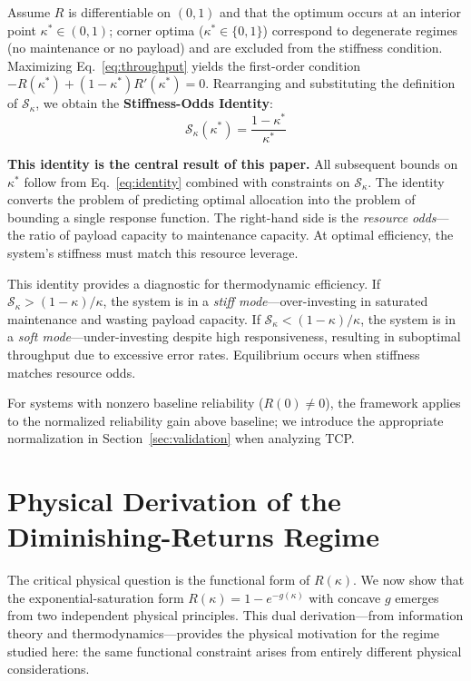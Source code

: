 \documentclass[11pt,twocolumn]{article}
\begin{document}
Assume $R$ is differentiable on $(0,1)$ and that the optimum occurs at an interior point $\kappa^* \in (0,1)$; corner optima ($\kappa^* \in \{0,1\}$) correspond to degenerate regimes (no maintenance or no payload) and are excluded from the stiffness condition. Maximizing Eq.~\eqref{eq:throughput} yields the first-order condition $-R(\kappa^*) + (1-\kappa^*)R'(\kappa^*) = 0$. Rearranging and substituting the definition of $\mathcal{S}_\kappa$, we obtain the \textbf{Stiffness-Odds Identity}:
\begin{equation}
\boxed{\mathcal{S}_\kappa(\kappa^*) = \frac{1-\kappa^*}{\kappa^*}}
\label{eq:identity}
\end{equation}

\noindent\textbf{This identity is the central result of this paper.} All subsequent bounds on $\kappa^*$ follow from Eq.~\eqref{eq:identity} combined with constraints on $\mathcal{S}_\kappa$. The identity converts the problem of predicting optimal allocation into the problem of bounding a single response function. The right-hand side is the \emph{resource odds}---the ratio of payload capacity to maintenance capacity. At optimal efficiency, the system's stiffness must match this resource leverage.

This identity provides a diagnostic for thermodynamic efficiency. If $\mathcal{S}_\kappa > (1-\kappa)/\kappa$, the system is in a \emph{stiff mode}---over-investing in saturated maintenance and wasting payload capacity. If $\mathcal{S}_\kappa < (1-\kappa)/\kappa$, the system is in a \emph{soft mode}---under-investing despite high responsiveness, resulting in suboptimal throughput due to excessive error rates. Equilibrium occurs when stiffness matches resource odds.

For systems with nonzero baseline reliability ($R(0) \neq 0$), the framework applies to the normalized reliability gain above baseline; we introduce the appropriate normalization in Section~\ref{sec:validation} when analyzing TCP.

\section{Physical Derivation of the Diminishing-Returns Regime}
\label{sec:physical_derivation}

The critical physical question is the functional form of $R(\kappa)$. We now show that the exponential-saturation form $R(\kappa) = 1 - e^{-g(\kappa)}$ with concave $g$ emerges from two independent physical principles. This dual derivation---from information theory and thermodynamics---provides the physical motivation for the regime studied here: the same functional constraint arises from entirely different physical considerations.
\end{document}
